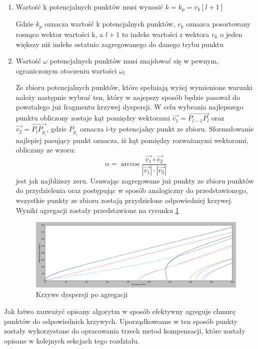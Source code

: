  \begin{enumerate}
 \item Wartość k potencjalnych punktów musi wynosić $k=k_p=v_k[l+1]$
 
 Gdzie $k_p$ oznacza wartość k potencjalnych punktów, $v_k$ oznazca posortowany rosnąco wektor wartości k, a $l+1$ to indeks wartości z wektora $v_k$ o jeden większy niż indeks ostatnio zagregowanego do danego trybu punktu
 \item Wartość $\omega$ potencjalnych punktów musi znajdować się w pewnym, ograniczonym otoczeniu wartości $\omega _l$
 
 Ze zbioru potencjalnych punktów, które spełniają wyżej wymienione warunki należy następnie wybrać ten, który w najepszy sposób będzie pasował do powstałego już fragmentu krzywej dyspersji. W celu wybrania najlepszego punktu obliczony zostaje kąt pomiędzy wektorami $\overrightarrow{v_1} = \overrightarrow{P_{l-1}P_l}$ oraz $\overrightarrow{v_2} = \overrightarrow{P_lP_{p_i}}$, gdzie $P_{p_i}$ oznacza i-ty potencjalny punkt ze zbioru. Sformułowanie najlepiej pasujący punkt oznacza, iż kąt pomiędzy rozważanymi wektorami, obliczany ze wzoru:
 \begin{equation}
 \alpha = \arccos\frac{\overrightarrow{v_1} \circ \overrightarrow{v_2}}{|\overrightarrow{v_1}|\cdot|\overrightarrow{v_2}|}
\end{equation}  
jest jak najbliższy zeru. Usuwając zagregowane już punkty ze zbioru punktów do przydzielenia oraz postępując w sposób analogiczny do przedstawionego, wszystkie punkty ze zbioru zostają przydzielone odpowiedniej krzywej. Wyniki agregacji zostały przedstawione na rysunku \ref{fig:krzywe_po_agregacji}
 
\begin{figure}[h]
\centering
\includegraphics[width=13cm]{Zdjecia/4/zagregowane_krzywe}
\caption{Krzywe dyspersji po agregacji}
\label{fig:krzywe_po_agregacji}
\end{figure}
\end{enumerate}  

Jak łatwo zauważyć opisany algorytm w sposób efektywny agreguje chmurę punktów do odpowiednich krzywych. Uporządkowoane w ten sposób punkty zostały wykorzystane do opracowania trzech metod kompensacji, które zostały opisane w kolejnych sekcjach tego rozdziału.




